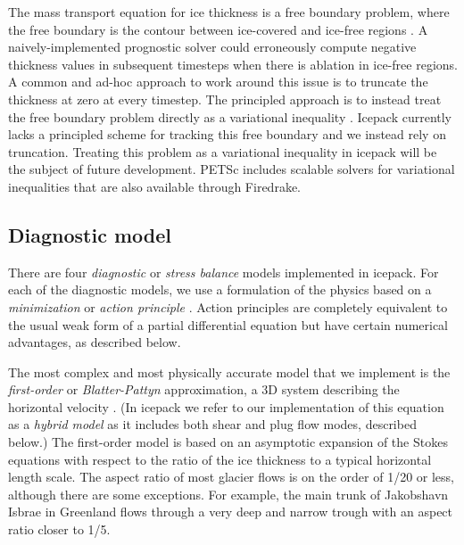 \documentclass[journal abbreviation, manuscript]{copernicus}
\begin{document}
The mass transport equation for ice thickness is a free boundary problem, where the free boundary is the contour between ice-covered and ice-free regions \citep{schoof2013ice}.
A naively-implemented prognostic solver could erroneously compute negative thickness values in subsequent timesteps when there is ablation in ice-free regions.
A common and ad-hoc approach to work around this issue is to truncate the thickness at zero at every timestep.
The principled approach is to instead treat the free boundary problem directly as a variational inequality \citep{jouvet2012steady}.
Icepack currently lacks a principled scheme for tracking this free boundary and we instead rely on truncation.
Treating this problem as a variational inequality in icepack will be the subject of future development.
PETSc includes scalable solvers for variational inequalities \citep{bueler2020petsc} that are also available through Firedrake.


\subsection{Diagnostic model}

There are four \emph{diagnostic} or \emph{stress balance} models implemented in icepack.
For each of the diagnostic models, we use a formulation of the physics based on a \emph{minimization} or \emph{action principle} \citep{dukowicz2010consistent}.
Action principles are completely equivalent to the usual weak form of a partial differential equation but have certain numerical advantages, as described below.

The most complex and most physically accurate model that we implement is the \emph{first-order} or \emph{Blatter-Pattyn} approximation, a 3D system describing the horizontal velocity \citep{blatter1995velocity, pattyn2003new}.
(In icepack we refer to our implementation of this equation as a \emph{hybrid model} as it includes both shear and plug flow modes, described below.)
The first-order model is based on an asymptotic expansion of the Stokes equations with respect to the ratio of the ice thickness to a typical horizontal length scale.
The aspect ratio of most glacier flows is on the order of 1/20 or less, although there are some exceptions.
For example, the main trunk of Jakobshavn Isbrae in Greenland flows through a very deep and narrow trough with an aspect ratio closer to 1/5.
\end{document}
